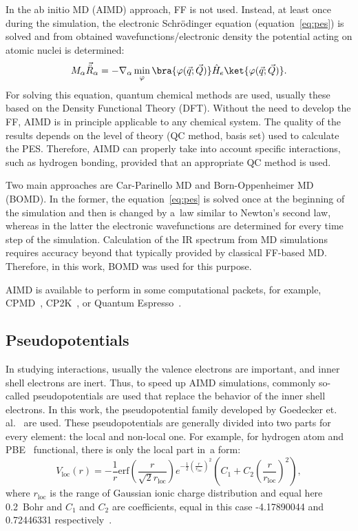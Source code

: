 In the ab initio MD (AIMD) approach, FF is not used. Instead, at least once during the simulation, the electronic Schr\"{o}dinger equation (equation~\ref{eq:pes}) is solved and from obtained wavefunctions/electronic density the potential acting on atomic nuclei is determined:
\begin{equation}
    M_{\alpha} \vec{\ddot{R}}_{\alpha} = -\nabla_{\alpha} \min_{\varphi} \bra{\varphi(\vec{q}; \vec{Q})} \hat{H}_e \ket{\varphi(\vec{q}; \vec{Q})}.
    \label{eq:bomd}
\end{equation}
For solving this equation, quantum chemical methods are used, usually these based on the Density Functional Theory (DFT). Without the need to develop the FF, AIMD is in principle applicable to any chemical system. The quality of the results depends on the level of theory (QC method, basis set) used to calculate the PES. Therefore, AIMD can properly take into account specific interactions, such as hydrogen bonding, provided that an appropriate QC method is used.

Two main approaches are Car-Parinello MD and Born-Oppenheimer MD~\cite{ab-initio-marx-hutter} (BOMD). In the former, the equation~\ref{eq:pes} is solved once at the beginning of the simulation and then is changed by a~law similar to Newton's second law, whereas in the latter the electronic wavefunctions are determined for every time step of the simulation. Calculation of the IR spectrum from MD simulations requires accuracy beyond that typically provided by classical FF-based MD. Therefore, in this work, BOMD was used for this purpose.

AIMD is available to perform in some computational packets, for example, CPMD~\cite{cpmd-software}, CP2K~\cite{cp2k}, or Quantum Espresso~\cite{quantum-espresso-1,quantum-espresso-2}.

\subsection{Pseudopotentials}

In studying interactions, usually the valence electrons are important, and inner shell electrons are inert. Thus, to speed up AIMD simulations, commonly so-called pseudopotentials are used that replace the behavior of the inner shell electrons. In this work, the pseudopotential family developed by Goedecker et. al.~\cite{goedecker-1,goedecker-2,goedecker-3} are used. These pseudopotentials are generally divided into two parts for every element: the local and non-local one. For example, for hydrogen atom and PBE~\cite{pbe-1,pbe-2,pbe-3,pbe-4} functional, there is only the local part in~a form:
\begin{equation}
    V_{\text{loc}} (r) = -\frac{1}{r} \text{erf}\left( \frac{r}{\sqrt{2}r_{\text{loc}}} \right) e^{-\frac{1}{2} \left( \frac{r}{r_{\text{loc}}} \right)^2} \left( C_1 + C_2 \left( \frac{r}{r_{\text{loc}}} \right)^2 \right),
\end{equation}
where $r_{\text{loc}}$ is the range of Gaussian ionic charge distribution and equal here 0.2~Bohr and $C_1$ and $C_2$ are coefficients, equal in this case -4.17890044 and 0.72446331 respectively~\cite{goedecker-3}.

